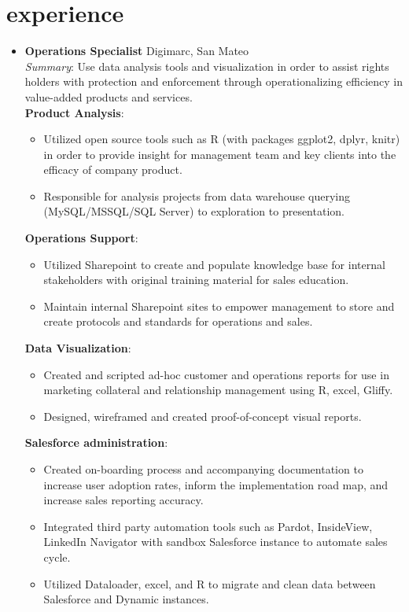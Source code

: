 \documentclass[]{friggeri-cv}
\renewenvironment{entrylist}{%
  \begin{itemize}[leftmargin=1in] %
}{%
  \end{itemize}
}
\renewcommand{\entry}[4]{%
  \item[#1]
    \textbf{#2}%
    \hfill%
    {\footnotesize\addfontfeature{Color=lightgray} #3}\\%
    #4\vspace{\parsep}%
  }
\begin{document}
\section{experience}

\begin{entrylist}
  \entry
    {03/15---curr.}
    {Operations Specialist}
    {Digimarc, San Mateo}
    {\textit{Summary}: Use data analysis tools and visualization in order to assist rights holders with protection and enforcement through operationalizing efficiency in value-added products and services.\\ 

\textbf {Product Analysis}: 
\begin{itemize}
\item Utilized open source tools such as R (with packages ggplot2, dplyr, knitr) in order to provide insight for management team and key clients into the efficacy of company product. 
\item Responsible for analysis projects from data warehouse querying (MySQL/MSSQL/SQL Server) to exploration to presentation. 
\end{itemize}

\textbf {Operations Support}:  
\begin{itemize}
\item Utilized Sharepoint to create and populate knowledge base for internal stakeholders with original training material for sales education. 
\item Maintain internal Sharepoint sites to empower management to store and create protocols and standards for operations and sales. 
\end{itemize}

\textbf {Data Visualization}: 
\begin{itemize}
\item Created and scripted ad-hoc customer and operations reports for use in marketing collateral and relationship management using R, excel, Gliffy. 
\item Designed, wireframed and created proof-of-concept visual reports. 
\end{itemize}



\textbf {Salesforce administration}: 
\begin{itemize}
\item Created on-boarding process and accompanying documentation to increase user adoption rates, inform the implementation road map, and increase sales reporting accuracy.
\item Integrated third party automation tools such as Pardot, InsideView, LinkedIn Navigator with sandbox Salesforce instance to automate sales cycle. 
\item Utilized Dataloader, excel, and R to migrate and clean data between Salesforce and Dynamic instances.
\end{itemize}
}
  


\end{entrylist}
\end{document}

